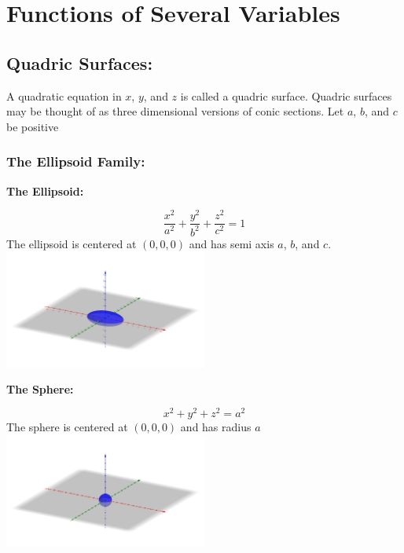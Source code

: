 \documentclass[14pt]{article}
\begin{document}
    \section{Functions of Several Variables}
    \subsection{Quadric Surfaces:}
    A quadratic equation in $x$, $y$, and $z$ is called a quadric
    surface. Quadric surfaces may be thought of as three dimensional
    versions of conic sections. Let $a$, $b$, and $c$ be positive
    \subsubsection{The Ellipsoid Family:}
    \textbf{The Ellipsoid:}
    \begin{multicols}{2}
        \begin{equation}
            \frac{x^2}{a^2}+\frac{y^2}{b^2}+\frac{z^2}{c^2}=1
        \end{equation}
        The ellipsoid is centered at $(0, 0, 0)$ and has semi axis $a$,
        $b$, and $c$.\\
        \includegraphics[width=0.5\textwidth]{Ellipsoid.png}
    \end{multicols}
    \textbf{The Sphere:}
    \begin{multicols}{2}
        \begin{equation}
            x^2+y^2+z^2=a^2
        \end{equation}
        The sphere is centered at $(0,0,0)$ and has radius $a$\\
        \includegraphics[width=0.5\textwidth]{Sphere.png}    
    \end{multicols}
    \pagebreak
\end{document}
